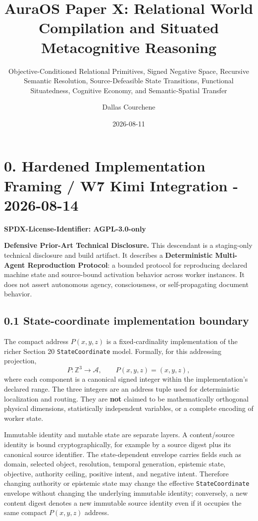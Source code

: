 \documentclass[
  10pt,
  letterpaper,
]{article}
\title{AuraOS Paper X: Relational World Compilation and Situated
Metacognitive Reasoning}
\subtitle{Objective-Conditioned Relational Primitives, Signed Negative
Space, Recursive Semantic Resolution, Source-Defeasible State
Transitions, Functional Situatedness, Cognitive Economy, and
Semantic-Spatial Transfer}
\author{Dallas Courchene}
\date{2026-08-11}
\begin{document}
\maketitle

\section{0. Hardened Implementation Framing / W7 Kimi Integration -
2026-08-14}\label{0-hardened-implementation-framing-w7-kimi-integration---2026-08-14}

\textbf{SPDX-License-Identifier: AGPL-3.0-only}

\textbf{Defensive Prior-Art Technical Disclosure.} This descendant is a
staging-only technical disclosure and build artifact. It describes a
\textbf{Deterministic Multi-Agent Reproduction Protocol}: a bounded protocol
for reproducing declared machine state and source-bound activation behavior
across worker instances. It does not assert autonomous agency, consciousness,
or self-propagating document behavior.

\subsection{0.1 State-coordinate implementation boundary}

The compact address $P(x,y,z)$ is a fixed-cardinality implementation of the
richer Section 20 \texttt{StateCoordinate} model. Formally, for this addressing
projection,
\[
P : \mathbb{Z}^{3} \rightarrow \mathcal{A}, \qquad P(x,y,z)=(x,y,z),
\]
where each component is a canonical signed integer within the implementation's
declared range. The three integers are an address tuple used for deterministic
localization and routing. They are \textbf{not} claimed to be mathematically
orthogonal physical dimensions, statistically independent variables, or a
complete encoding of worker state.

Immutable identity and mutable state are separate layers. A content/source
identity is bound cryptographically, for example by a source digest plus its
canonical source identifier. The state-dependent envelope carries fields such
as domain, selected object, resolution, temporal generation, epistemic state,
objective, authority ceiling, positive intent, and negative intent. Therefore
changing authority or epistemic state may change the effective
\texttt{StateCoordinate} envelope without changing the underlying immutable
identity; conversely, a new content digest denotes a new immutable source
identity even if it occupies the same compact $P(x,y,z)$ address.
\end{document}
